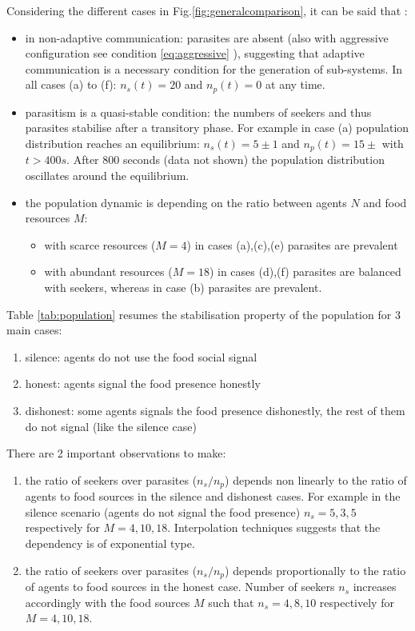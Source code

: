 Considering the different cases in Fig.\ref{fig:generalcomparison}, it can be said that :
\begin{itemize}
\item in non-adaptive communication: parasites are absent (also with aggressive configuration see condition \ref{eq:aggressive} ), suggesting that adaptive communication is a necessary condition for the generation of sub-systems. In all cases (a) to (f): $n_{s}(t)=20$ and $n_{p}(t)=0$ at any time.
\item parasitism is a quasi-stable condition: the numbers of seekers and thus parasites stabilise after a transitory phase. For example in case (a) population distribution reaches an equilibrium: $n_{s}(t)=5\pm 1$ and $n_{p}(t)=15\pm$ with $t>400 s$. After 800 seconds (data not shown) the population distribution oscillates around the equilibrium.
\item the population dynamic is depending on the ratio between agents $N$ and food resources $M$:
\begin{itemize}
\item with scarce resources ($M=4$) in cases (a),(c),(e) parasites are prevalent
\item with abundant resources ($M=18$) in cases (d),(f) parasites are balanced with seekers, whereas in case (b) parasites are prevalent.
\end{itemize}
\end{itemize}
Table \ref{tab:population} resumes the stabilisation property of the population for 3 main cases:
\begin{enumerate}
\item silence: agents do not use the food social signal
\item honest: agents signal the food presence honestly
\item dishonest: some agents signals the food presence dishonestly, the rest of them do not signal (like the silence case)
\end{enumerate}

There are 2 important observations to make:
\begin{enumerate}
\item the ratio of seekers over parasites ($n_{s}/n_{p}$) depends non linearly to
the ratio of agents to food sources in the silence and dishonest cases. For example in
the silence scenario (agents do not signal the food presence) $n_{s}=5,3,5$
respectively for $M=4,10,18$. Interpolation techniques suggests that the dependency
is of exponential type.
\item the ratio of seekers over parasites ($n_{s}/n_{p}$) depends proportionally to the
ratio of agents to food sources in the honest case. Number of seekers $n_{s}$ increases
accordingly with the food sources $M$ such that $n_{s}=4,8,10$ respectively for $M=4,10,18$.
\end{enumerate}

